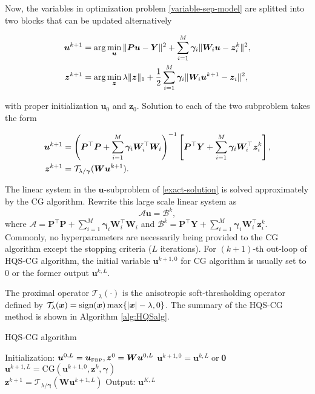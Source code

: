 \documentclass[journal,twoside]{IEEEtran}
\newcommand{\sign}{\ensuremath{\text{\rm sign}}}
\begin{document}
Now, the variables in optimization problem \eqref{variable-sep-model} are splitted into two blocks that can be updated alternatively
\begin{small}
\begin{align}
 \bm{u}^{k+1}&=\arg\min_{\bm{u}}\|\bm{P}\bm{u}-\bm{Y}\|^{2}+\sum_{i=1}^{M} \bm{\gamma}_{i}\|\bm{W}_{i}\bm{u}-\bm{z}^{k}_{i}\|^2,\notag\\
 \bm{z}^{k+1}&=\arg\min_{\bm{z}}\lambda \|\bm{z}\|_{1}+\frac{1}{2}\sum_{i=1}^{M} \bm{\gamma}_{i}\|\bm{W}_{i}\bm{u}^{k+1}-\bm{z}_{i}\|^2,
 \end{align}
\end{small}
with proper initialization $\bm{u}_{0}$ and $\bm{z}_{0}$. Solution to each of the two subproblem takes the form
\begin{small}
\begin{align}\label{exact-solution}
 \bm{u}^{k+1}&=\left(\bm{P}^{\top}\bm{P}+\sum_{i=1}^{M}\bm{\gamma}_{i}\bm{W}_{i}^{\top}\bm{W}_{i}\right)^{-1}\left[ \bm{P}^{\top}\bm{Y}+\sum_{i=1}^{M}\bm{\gamma}_{i}\bm{W}_{i}^{\top}\bm{z}_{i}^{k}\right],\notag\\
 \bm{z}^{k+1}&=\mathcal{T}_{\lambda/\bm{\gamma}}(\bm{W}\bm{u}^{k+1}).
\end{align}
\end{small}

The linear system in the $\bm{u}$-subproblem of \eqref{exact-solution} is solved approximately by the CG algorithm. Rewrite this large scale linear system as 
$$\bm{\mathcal{A}}\bm{u}=\bm{\mathcal{B}}^{k},$$ 
where $\bm{\mathcal{A}}=\bm{P}^{\top}\bm{P}+\sum_{i=1}^{M}\bm{\gamma}_{i}\bm{W}_{i}^{\top}\bm{W}_{i}$ and $\bm{\mathcal{B}}^{k}=\bm{P}^{\top}\bm{Y}+\sum_{i=1}^{M}\bm{\gamma}_{i}\bm{W}_{i}^{\top}\bm{z}_{i}^{k}$. 
Commonly, no hyperparameters are necessarily being provided to the CG algorithm except the stopping criteria ($L$ iterations). For $(k+1)$-th out-loop of HQS-CG algorithm, the initial variable $\bm{u}^{k+1,0}$ for CG algorithm is usually set to $0$ or the former output $\bm{u}^{k,L}$. 

The proximal operator $\mathcal{T}_{\lambda}(\cdot)$ is the anisotropic soft-thresholding operator defined by
$\mathcal{T}_{\lambda}(\bm{x})=\sign{(\bm{x})}\max\{|\bm{x}|-\lambda,0\}$.
The summary of the HQS-CG method is shown in Algorithm \ref{alg:HQSalg}.

\begin{algorithm}[t]
\caption{HQS-CG algorithm}
\label{alg:HQSalg}
\begin{algorithmic}[1]
\STATE 
\small{Initialization:} $\bm{u}^{0,L}=\bm{u}_{\mbox{\tiny FBP}},\bm{z}^{0}=\bm{W}\bm{u}^{0,L}$
\STATE
$\bm{u}^{k+1,0}=\bm{u}^{k,L} \;\mbox{or}\; \bm{0}$\\
$\bm{u}^{k+1,L}=\mbox{CG}(\bm{u}^{k+1,0},\bm{z}^{k},\bm{\gamma})$ \\
$\bm{z}^{k+1}=\mathcal{T}_{\lambda/\bm{\gamma}}(\bm{W}\bm{u}^{k+1,L})$
\ENDFOR
\STATE Output: $\bm{u}^{K,L}$
\end{algorithmic}
\end{algorithm}
\end{document}
